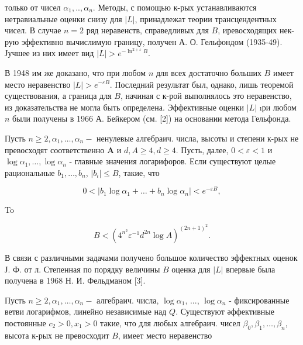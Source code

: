 \documentclass[10pt]{article}
\begin{document}
только от чисел $\alpha_{1}, . ., \alpha_{n}$. Методы, с помощью к-рых устанавливаются нетравиальные оценки снизу для $|L|$, принадлежат теории трансцендентных чисел. В случае $n=2$ ряд неравенств, справедливых для $B$, иревосходящих нек-рую эффективно вычислимую границу, получен А. О. Гельфондом (1935-49). Јучшее из них имеет вид $|L|>e^{-\ln ^{2+\varepsilon} B}$.



В 1948 им же доказано, что при любом $n$ для всех достаточно больших $B$ имеет место неравенство $|L|>e^{-\varepsilon B}$. Последний результат был, однако, лишь теоремой существования, а граница для $B$, начиная с к-рой выполнялось это неравенство, из доказательства не могла быть определена. Эффективные оценки $|L|$ ıри любом $n$ были получены в 1966 А. Бейкером (см. [2]) на основании метода Гельфонда.



Пусть $n \geqslant 2, \alpha_{1}, \ldots, \alpha_{n}-$ ненулевые алгебраич. числа, высоты и степени к-рых не превосходят соответственно $\boldsymbol{A}$ и $d, A \geqslant 4, d \geqslant 4$. Пусть, далее, $0<\varepsilon<1$ и $\log \alpha_{1}, \ldots, \log \alpha_{n}$ - главные значения логарифоров. Если существуют целые рациональные $b_{1}, \ldots, b_{n}$, $\left|b_{i}\right| \leqslant B$, такие, что



\[

0<\left|b_{1} \log \alpha_{1}+\ldots+b_{n} \log \alpha_{n}\right|<e^{-\varepsilon B},

\]



To



\[

B<\left(4^{n^{2}} \varepsilon^{-1} d^{2 n} \log A\right)^{(2 n+1)^{2}} .

\]



В связи с различными задачами получено большое количество эффектных оценок Ј. Ф. от л. Степенная по порядку величины $B$ оценка для $|L|$ впервые была получена в 1968 Н. И. Фельдманом [3].



Пусть $n \geqslant 2, \alpha_{1}, \ldots, \alpha_{n}-$ алгебраич. числа, $\log \alpha_{1}$, ..., $\log \alpha_{n}$ - фиксированные ветви логарифмов, линейно независимые над $Q$. Существуют әффективные постоянные $c_{2}>0, x_{1}>0$ такие, что для любых алгебраич. чисел $\beta_{0}, \beta_{1}, \ldots, \beta_{n}$, высота к-рых не превосходит $B$, имеет место неравенство
\end{document}
